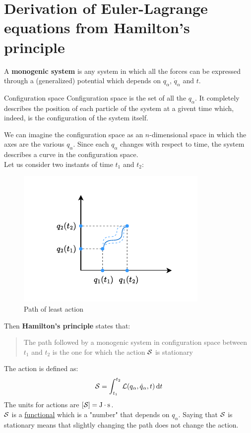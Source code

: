 \section{Derivation of Euler-Lagrange equations from Hamilton's principle}
A \textbf{monogenic system} is any system in which all the forces can be expressed through a (generalized) potential which depends on $q_{\alpha}$, $\dot{q}_{\alpha}$ and $t$.
\begin{definition}{Configuration space}
  Configuration space is the set of all the $q_{\alpha}$. It completely describes the position of each particle of the system at a givent time which, indeed, is the configuration of the system itself.
\end{definition}
We can imagine the configuration space as an $n$-dimensional space in which the axes are the various $q_{\alpha}$.
Since each $q_{\alpha}$ changes with respect to time, the system describes a curve in the configuration space.\\
Let us consider two instants of time $t_1$ and $t_2$:
\begin{figure}[H]
    \centering
    \includegraphics[width=0.6\linewidth]{res/svg/leastactionpath.drawio}
    \caption{Path of least action}
    \label{fig:image9}
\end{figure}
Then \textbf{Hamilton's principle} states that:
\begin{quote} \label{q:Hamilton_principle_quote} %
    The path followed by a monogenic system in configuration space between $t_1$ and $t_2$ is the one for which the action $\mathcal{S}$ is stationary
\end{quote}
The action is defined as:
\begin{equation}
    \mathcal{S} = \int_{t_1}^{t_2}\mathcal{L}(q_{\alpha},\dot{q}_{\alpha},t) \dd{t}
\end{equation}
The units for actions are $[\mathcal{S}] = \mathrm{J\cdot s}$.\\ $\mathcal{S}$ is a \underline{functional} which is a "number" that depends on $q_{\alpha}$. Saying that $\mathcal{S}$ is stationary means that slightly changing the path does not change the action.\\
